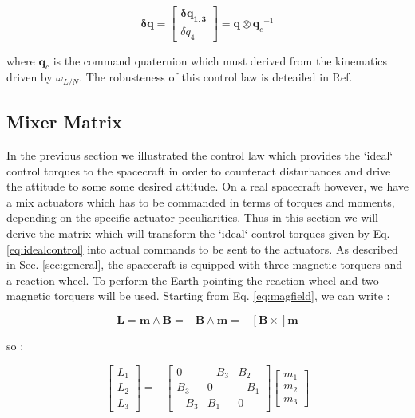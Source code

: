 \documentclass[11pt,a4paper]{report}
\begin{document}
\begin{equation}
 \mathbf{\delta q} =                                       
                      \begin{bmatrix}
                           \mathbf{\delta q_{1:3}} \\
                           \mathit{\delta q_{4}}
                      \end{bmatrix}
                                                             = \mathbf{q} \otimes {\mathbf{q}_{c}}^{-1}
\end{equation}

where $\mathbf{q}_{c}$ is the command quaternion which must derived from the kinematics driven by $\omega_{L/N}$.
The robusteness of this control law is deteailed in Ref. \cite{Ref:Books:Fundamentals}

\subsection{Mixer Matrix}
In the previous section we illustrated the control law which provides the `ideal` control torques to the spacecraft in order to counteract disturbances and drive the attitude to some some desired attitude.
On a real spacecraft however, we have a mix actuators which has to be commanded in terms of torques and moments, depending on the specific actuator peculiarities.
Thus in this section we will derive the matrix which will transform the `ideal` control torques given by Eq. \ref{eq:idealcontrol} into actual commands to be sent to the actuators. 
As described in Sec. \ref{sec:general}, the spacecraft is equipped with three magnetic torquers and a reaction wheel. 
To perform the Earth pointing the reaction wheel and two magnetic torquers will be used.
Starting from Eq. \ref{eq:magfield}, we can write :

\begin{equation}
 \mathbf{L} = \mathbf{m} \wedge \mathbf{B} = - \mathbf{B} \wedge \mathbf{m} = -[\mathbf{B} \times] \mathbf{m} 
\end{equation}

so : 


\begin{equation}
 \begin{bmatrix}
    L_1\\
    L_2\\
    L_3 
 \end{bmatrix}
= - 
 \begin{bmatrix}
    0 & -B_{3} & B_{2} \\
    B_{3} & 0 & -B_{1} \\
   -B_{3} & B_{1} & 0
 \end{bmatrix} 
 \begin{bmatrix}
    m_{1}\\
    m_{2}\\
    m_{3}
 \end{bmatrix}  
\end{equation}
\end{document}
